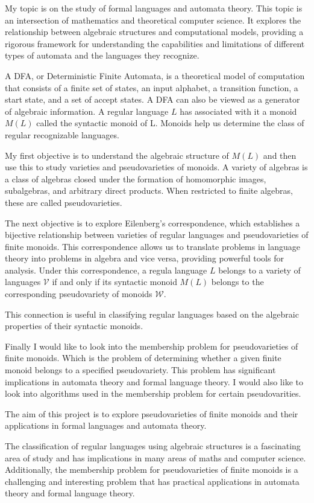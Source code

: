 My topic is on the study of formal languages and automata theory. This topic is an intersection of mathematics and theoretical computer science. It explores the relationship between
algebraic structures and computational models, providing a rigorous framework for understanding the capabilities and limitations of different types of automata and the languages they recognize.

A DFA, or Deterministic Finite Automata, is a theoretical model of computation that consists of a finite set of states, an input alphabet, a transition function, a start state, and a set of accept states. A DFA can also be viewed as a generator of algebraic information.
A regular language $L$ has associated with it a monoid $M(L)$ called the syntactic monoid of L.
Monoids help us determine the class of regular recognizable languages.

My first objective is to understand the algebraic structure of $M(L)$ and then use this to study varieties and pseudovarieties of monoids.
A variety of algebras is a class of algebras closed under the formation of homomorphic images, subalgebras, and arbitrary direct products. When restricted to finite algebras, these are called pseudovarieties.

The next objective is to explore Eilenberg's correspondence, which establishes a bijective relationship between varieties of regular languages and pseudovarieties of finite monoids.
This correspondence allows us to translate problems in language theory into problems in algebra and vice versa, providing powerful tools for analysis. Under this correspondence, a regula language $L$
belongs to a variety of languages $\mathcal{V}$ if and only if its syntactic monoid $M(L)$ belongs to the corresponding pseudovariety of monoids $\mathcal{W}$.

This connection is useful in classifying regular languages based on the algebraic properties of their syntactic monoids.

Finally I would like to look into the membership problem for pseudovarieties of finite monoids. Which is the problem of determining whether a given finite monoid belongs to a specified pseudovariety.
This problem has significant implications in automata theory and formal language theory. I would also like to look into algorithms used in the membership problem for certain pseudovarities.

\begin{framed}
    The aim of this project is to explore pseudovarieties of finite monoids and their applications in formal languages and automata theory.
\end{framed}
The classification of regular languages using algebraic structures is a fascinating area of study and has implications
in many areas of maths and computer science. Additionally, the membership problem for pseudovarieties of finite monoids is a challenging and interesting problem that has practical applications in automata theory and formal language theory.